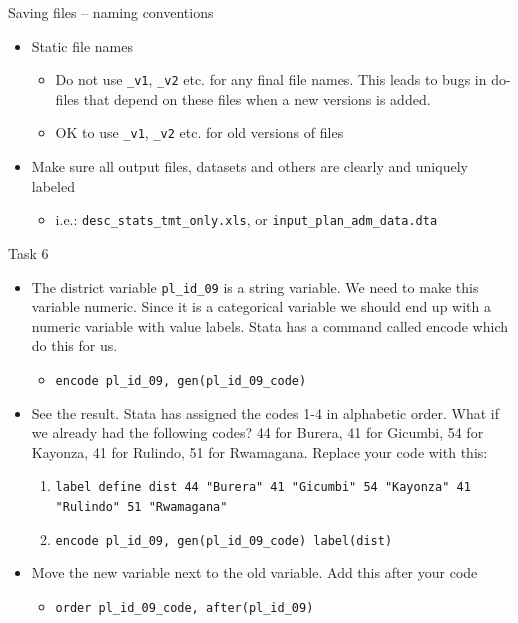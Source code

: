 \documentclass[aspectratio=169]{beamer}
\begin{document}
\begin{frame}{Saving files – naming conventions}
	\begin{itemize}
		\item Static file names
		\begin{itemize}
			\item 	Do not use \texttt{\_v1}, \texttt{\_v2} etc. for any final file names. This leads to bugs in do-files that depend on these files when a new versions is added.
			\item OK to use \texttt{\_v1}, \texttt{\_v2} etc. for old versions of files
		\end{itemize}
		\item Make sure all output files, datasets and others are clearly and uniquely labeled
		\begin{itemize}
			\item  i.e.: \texttt{desc\_stats\_tmt\_only.xls}, or \texttt{input\_plan\_adm\_data.dta}
		\end{itemize}
	\end{itemize}
\end{frame}

\begin{frame}{Task 6}
	\begin{itemize}
		\item The district variable \texttt{pl\_id\_09} is a string variable. We need to make this variable numeric. Since it is a categorical variable we should end up with a numeric variable with value labels. Stata has a command called encode which do this for us. 
		\begin{itemize}
			\item \texttt{encode  pl\_id\_09,  gen(pl\_id\_09\_code)}
		\end{itemize}
		\item See the result. Stata has assigned the codes 1-4 in alphabetic order. What if we already had the following codes? 44 for Burera, 41  for Gicumbi, 54 for Kayonza,  41 for Rulindo, 51 for Rwamagana. Replace your code with this:
		\begin{enumerate}
			\item 	\texttt{label define dist 44 "Burera" 41 "Gicumbi" 54 "Kayonza" 41 "Rulindo" 51 "Rwamagana"}
			\item   \texttt{encode  pl\_id\_09,  gen(pl\_id\_09\_code) label(dist)}
		\end{enumerate}
		\item Move the new variable next to the old variable. Add this after your code
		\begin{itemize}
			\item \texttt{order pl\_id\_09\_code, after(pl\_id\_09)}
		\end{itemize}
	\end{itemize}
\end{frame}
	
\end{document}
